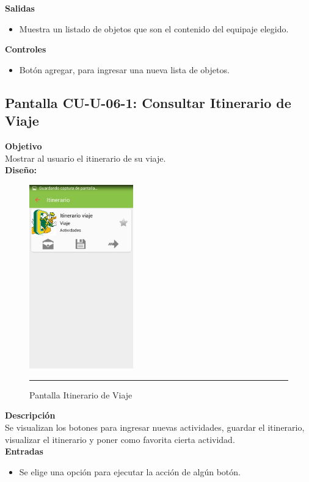 \textbf{Salidas}
\begin{itemize}
\item Muestra un listado de objetos que son el contenido del equipaje elegido.
\end{itemize}

\textbf{Controles}
\begin{itemize}
\item Botón agregar, para ingresar una nueva lista de objetos.
\end{itemize}
\clearpage
\hypertarget{CU-U-06-1}{}
\subsection{Pantalla CU-U-06-1: Consultar Itinerario de Viaje}
\textbf{Objetivo}\\
Mostrar al usuario el itinerario de su viaje. \\

\textbf{Diseño:}
\begin{figure}[h]
	\centering
		\includegraphics[width=0.4\textwidth]{Figuras/intItinerarioViaje.jpg}
		\rule{30em}{0.5pt}
	\caption[Pantalla Itinerario de Viaje]{Pantalla Itinerario de Viaje}
	\label{fig:intItinerarioViaje}
\end{figure}

\textbf{Descripción} \\
Se visualizan los botones para ingresar nuevas actividades, guardar el itinerario, visualizar el itinerario y poner como favorita cierta actividad. \\

\textbf{Entradas}
\begin{itemize}
\item Se elige una opción para ejecutar la acción de algún botón.
\end{itemize}

